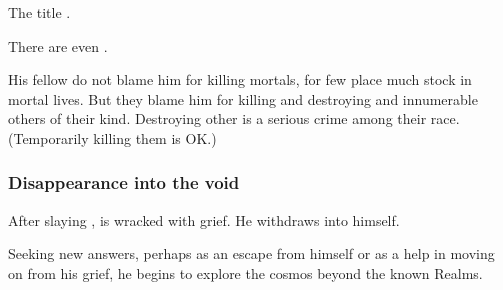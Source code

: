 The title .

There are even . 

His fellow \dragons{} do not blame him for killing mortals, for few \dragons{} place much stock in mortal lives. 
But they blame him for killing and destroying \Rystessakhin{} and innumerable others of their kind. 
Destroying other \dragons{} is a serious crime among their race. 
(Temporarily killing them is OK.)








\subsubsection{Disappearance into the void}
After slaying \Triestessakhin, \Ishnaruchaefir{} is wracked with grief. 
He withdraws into himself. 

Seeking new answers, perhaps as an escape from himself or as a help in moving on from his grief, he begins to explore the cosmos beyond the known Realms. 

